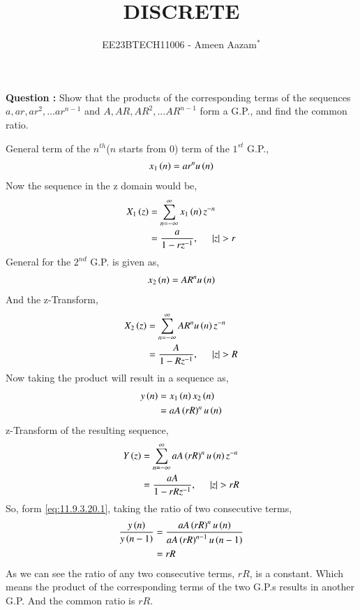 \documentclass[journal,12pt,twocolumn]{IEEEtran}
\theoremstyle{remark}
\begin{document}

\vspace{3cm}

\title{DISCRETE}
\author{EE23BTECH11006 - Ameen Aazam$^{*}$%
}
\maketitle
\newpage
\bigskip

\renewcommand{\thefigure}{\theenumi}
\renewcommand{\thetable}{\theenumi}

\vspace{3cm}
\textbf{Question :}
Show that the products of the corresponding terms of the sequences $a, ar, ar^2, \ldots ar^{n-1}$ and $A, AR, AR^2, \ldots AR^{n-1}$ form a G.P., and find the common ratio.

\solution

General term of the $n^{th}$($n$ starts from $0$) term of the $1^{st}$ G.P.,
\begin{align}
    x_1\left(n\right)=ar^nu\left(n\right)
\end{align}
Now the sequence in the z domain would be,
\begin{align}
    X_1\brak{z}&=\sum\limits_{n=-\infty}^{\infty}x_1\brak{n}z^{-n} \\
    &=\frac{a}{1-rz^{-1}},\hspace{0.5cm}|z|>r
\end{align}
General for the $2^{nd}$ G.P. is given as,
\begin{align}
    x_2\left(n\right)=AR^nu\left(n\right)
\end{align}
And the z-Transform,
\begin{align}
    X_2\brak{z}&=\sum\limits_{n=-\infty}^{\infty}AR^nu\brak{n}z^{-n} \\
    &=\frac{A}{1-Rz^{-1}},\hspace{0.5cm}|z|>R
\end{align}
Now taking the product will result in a sequence as,
\begin{align}
    y\left(n\right)&=x_1\left(n\right)x_2\left(n\right) \\
    &=aA\left(rR\right)^nu\left(n\right) \label{eq:11.9.3.20.1}
\end{align}
z-Transform of the resulting sequence,
\begin{align}
    Y\brak{z}&=\sum\limits_{n=-\infty}^{\infty}aA\brak{rR}^nu\brak{n}z^{-n} \\
    &=\frac{aA}{1-rRz^{-1}},\hspace{0.5cm}|z|>rR
\end{align}
So, form \ref{eq:11.9.3.20.1}, taking the ratio of two consecutive terms,
\begin{align}
    \frac{y\left(n\right)}{y\left(n-1\right)}&=\frac{aA\left(rR\right)^nu\left(n\right)}{aA\left(rR\right)^{n-1}u\left(n-1\right)} \\
    &=rR
\end{align}
As we can see the ratio of any two consecutive terms, $rR$, is a constant. Which means the product of the corresponding terms of the two G.P.s results in another G.P.
And the common ratio is $rR$.
\end{document}
